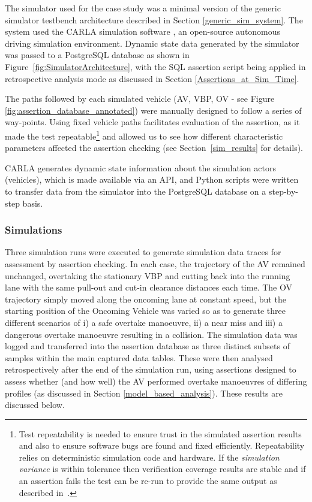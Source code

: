 The simulator used for the case study was a minimal version of the generic simulator testbench architecture described in Section \ref{generic_sim_system}. The system used the CARLA simulation software \cite{CarlaSimulator}, an open-source autonomous driving simulation environment. Dynamic state data generated by the simulator was passed to a PostgreSQL database as shown in Figure~\ref{fig:SimulatorArchitecture}, with the SQL assertion script being applied in retrospective analysis mode as discussed in Section \ref{Assertions_at_Sim_Time}.

The paths followed by each simulated vehicle (AV, VBP, OV - see Figure \ref{fig:assertion_database_annotated}) were manually designed to follow a series of way-points. Using fixed vehicle paths facilitates evaluation of the assertion, as it made the test repeatable\footnote{Test repeatability is needed to ensure trust in the simulated assertion results and also to ensure software bugs are found and fixed efficiently. Repeatability relies on deterministic simulation code and hardware. If the \emph{simulation variance} is within tolerance then verification coverage results are stable and if an assertion fails the test can be re-run to provide the same output as described in~\cite{chance2021}.} and allowed us to see how different characteristic parameters affected the assertion checking (see Section~\ref{sim_results} for details). 


CARLA generates dynamic state information about the simulation actors (vehicles), which is made available via an API, and Python scripts were written to transfer data from the simulator into the PostgreSQL database on a step-by-step basis.

\subsubsection{Simulations}

Three simulation runs were executed to generate simulation data traces for assessment by assertion checking. In each case, the trajectory of the AV remained unchanged, overtaking the stationary VBP and cutting back into the running lane with the same pull-out and cut-in clearance distances each time. The OV trajectory simply moved along the oncoming lane at constant speed, but the starting position of the Oncoming Vehicle was varied so as to generate three different scenarios of i) a safe overtake manoeuvre, ii) a near miss and iii) a dangerous overtake manoeuvre resulting in a collision. The simulation data was logged and transferred into the assertion database as three distinct subsets of samples within the main captured data tables. These were then analysed retrospectively after the end of the simulation run, using assertions designed to assess whether (and how well) the AV performed overtake manoeuvres of differing profiles (as discussed in Section \ref{model_based_analysis}). These results are discussed below.

